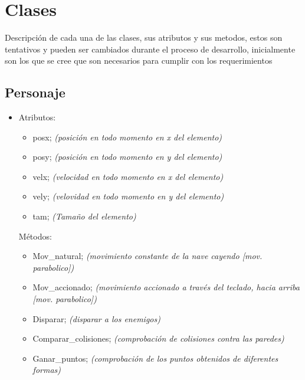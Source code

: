 \documentclass{article}
\begin{document}
\section{Clases} \label{contenido}
Descripción de cada una de las clases, sus atributos y sus metodos, estos son tentativos y pueden ser cambiados durante el proceso de desarrollo, inicialmente son los que se cree que son necesarios para cumplir con los requerimientos
\subsection{Personaje}
\begin{itemize}
    \item Atributos:
    \begin{itemize}
        \item posx; \textit{(posición en todo momento en x del elemento)}
        \item posy; \textit{(posición en todo momento en y del elemento)}
        \item velx; \textit{(velocidad en todo momento en x del elemento)}
        \item vely; \textit{(velovidad en todo momento en y del elemento)}
        \item tam;  \textit{(Tamaño del elemento)}
    \end{itemize}
    Métodos:
    \begin{itemize}
        \item Mov\_natural; \textit{(movimiento constante de la nave cayendo [mov. parabolico])}
        \item Mov\_accionado; \textit{(movimiento accionado a través del teclado, hacia arriba [mov. parabolico])}
        \item Disparar; \textit{(disparar a los enemigos)}
        \item Comparar\_colisiones; \textit{(comprobación de colisiones contra las paredes)}
        \item Ganar\_puntos; \textit{(comprobación de los puntos obtenidos de diferentes formas)}
    \end{itemize}
\end{itemize}
\end{document}
